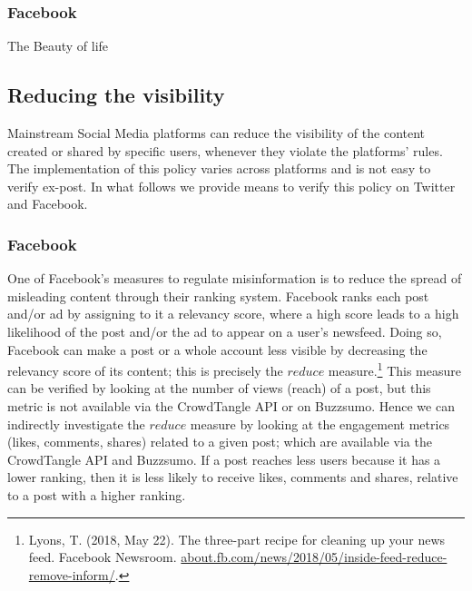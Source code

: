 \documentclass{article}
\begin{document}
\subsubsection{Facebook}

{\color{pink}The Beauty of life}

\subsection{Reducing the visibility}

Mainstream Social Media platforms can reduce the visibility of the content created or shared by specific users, whenever they violate the platforms' rules. The implementation of this policy varies across platforms and is not easy to verify ex-post. In what follows we provide means to verify this policy on Twitter and Facebook.  

\subsubsection{Facebook}

One of Facebook’s measures to regulate misinformation is to reduce the spread of misleading content through their ranking system. Facebook ranks each post and/or ad by assigning to it a relevancy score, where a high score leads to a high likelihood of the post and/or the ad to appear on a user's newsfeed. Doing so, Facebook can make a post or a whole account less visible by decreasing the relevancy score of its content; this is precisely the $reduce$ measure.\footnote{Lyons, T. (2018, May 22). The three-part recipe for cleaning up your news feed. Facebook Newsroom. \href{https://about.fb.com/news/2018/05/inside-feed-reduce-remove-inform/}{about.fb.com/news/2018/05/inside-feed-reduce-remove-inform/}.} This measure can be verified by looking at the number of views (reach) of a post, but this metric is not available via the CrowdTangle API or on Buzzsumo. Hence we can indirectly investigate the $reduce$ measure by looking at the engagement metrics (likes, comments, shares) related to a given post; which are available via the CrowdTangle API and Buzzsumo. If a post reaches less users because it has a lower ranking, then it is less likely to receive likes, comments and shares, relative to a post with a higher ranking. 

\end{document}
